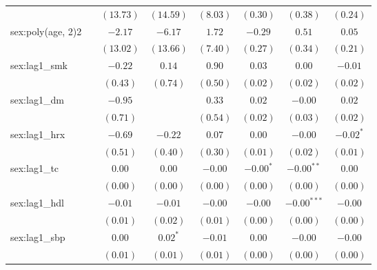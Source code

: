\begin{tabular}{l c c c c c c c}
                     &               & $(13.73)$     & $(14.59)$    & $(8.03)$      & $(0.30)$     & $(0.38)$      & $(0.24)$      \\
sex:poly(age, 2)2    &               & $-2.17$       & $-6.17$      & $1.72$        & $-0.29$      & $0.51$        & $0.05$        \\
                     &               & $(13.02)$     & $(13.66)$    & $(7.40)$      & $(0.27)$     & $(0.34)$      & $(0.21)$      \\
sex:lag1\_smk        &               & $-0.22$       & $0.14$       & $0.90$        & $0.03$       & $0.00$        & $-0.01$       \\
                     &               & $(0.43)$      & $(0.74)$     & $(0.50)$      & $(0.02)$     & $(0.02)$      & $(0.02)$      \\
sex:lag1\_dm         &               & $-0.95$       &              & $0.33$        & $0.02$       & $-0.00$       & $0.02$        \\
                     &               & $(0.71)$      &              & $(0.54)$      & $(0.02)$     & $(0.03)$      & $(0.02)$      \\
sex:lag1\_hrx        &               & $-0.69$       & $-0.22$      & $0.07$        & $0.00$       & $-0.00$       & $-0.02^{*}$   \\
                     &               & $(0.51)$      & $(0.40)$     & $(0.30)$      & $(0.01)$     & $(0.02)$      & $(0.01)$      \\
sex:lag1\_tc         &               & $0.00$        & $0.00$       & $-0.00$       & $-0.00^{*}$  & $-0.00^{**}$  & $0.00$        \\
                     &               & $(0.00)$      & $(0.00)$     & $(0.00)$      & $(0.00)$     & $(0.00)$      & $(0.00)$      \\
sex:lag1\_hdl        &               & $-0.01$       & $-0.01$      & $-0.00$       & $-0.00$      & $-0.00^{***}$ & $-0.00$       \\
                     &               & $(0.01)$      & $(0.02)$     & $(0.01)$      & $(0.00)$     & $(0.00)$      & $(0.00)$      \\
sex:lag1\_sbp        &               & $0.00$        & $0.02^{*}$   & $-0.01$       & $0.00$       & $-0.00$       & $-0.00$       \\
                     &               & $(0.01)$      & $(0.01)$     & $(0.01)$      & $(0.00)$     & $(0.00)$      & $(0.00)$      \\

\end{tabular}
